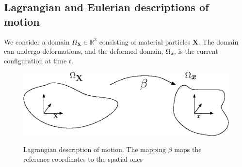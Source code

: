 \subsection{Lagrangian and Eulerian descriptions of motion}
We consider a domain $\Omega_{\mathbf{X}} \in \mathbb{R}^3$ consisting of material particles $\mathbf{X}$. The domain can undergo deformations, and the deformed domain, $\Omega_{\textit{\textbf{x}}}$, is the current configuration at time $t$. 
\begin{center}
\begin{figure}[!ht]
\includegraphics{figures/Lagrangian_domain} \label{Lagrangian}
\caption{Lagrangian description of motion. The mapping $\beta$ maps the reference coordinates to the spatial ones}
\end{figure}
\end{center}

